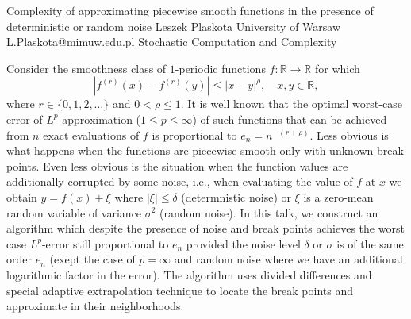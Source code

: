 \begin{talk}
  {Complexity of approximating piecewise smooth functions in the presence of deterministic or random noise}%
  {Leszek Plaskota}%
  {University of Warsaw}%
  {L.Plaskota@mimuw.edu.pl}%
  {}%
  {Stochastic Computation and Complexity}%
    
   
Consider the smoothness class of $1$-periodic functions $f:\mathbb R\to\mathbb R$ for which 
$$|f^{(r)}(x)-f^{(r)}(y)|\le |x-y|^\rho,\quad x,y\in\mathbb R,$$ 
where $r\in\{0,1,2,\ldots\}$ and $0<\rho\le 1.$ It is well known that the optimal worst-case error of $L^p$-approximation ($1\le p\le\infty$) of such functions that can be achieved from $n$ exact evaluations of $f$ is proportional to $e_n=n^{-(r+\rho)}.$ Less obvious is what happens when the functions are piecewise smooth only with unknown break points. Even less obvious is the situation when the function values are additionally corrupted by some noise, i.e., when evaluating the value of $f$ at $x$ we obtain $y=f(x)+\xi$ where $|\xi|\le\delta$ (determnistic noise) or $\xi$ is a zero-mean random variable of variance $\sigma^2$ (random noise). In this talk, we construct an algorithm which despite the presence of noise and break points achieves the worst case $L^p$-error still proportional to $e_n$ provided the noise level $\delta$ or $\sigma$ is of the same order $e_n$ (exept the case of $p=\infty$ and random noise where we have an additional logarithmic factor in the error). The algorithm uses divided differences and special adaptive extrapolation technique to locate the break points and approximate in their neighborhoods. 

\end{talk}

